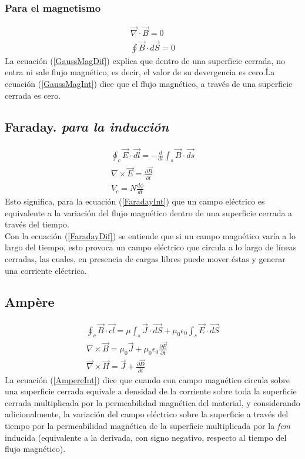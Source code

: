 \documentclass[12pt,spanish,lettersize,twocolumn]{article}
\begin{document}
\subsubsection{Para el magnetismo}
\begin{eqnarray}
\overrightarrow{\nabla}\cdot\overrightarrow{B} = 0\label{GaussMagDif}\\
\oint\overrightarrow{B}\cdot d\overrightarrow{S}=0\label{GaussMagInt}
\end{eqnarray}
La ecuaci\'on (\ref{GaussMagDif}) explica que dentro de una superficie cerrada, no entra ni sale flujo magn\'etico, es decir, el valor de su devergencia es cero.\'
La ecuaci\'on (\ref{GaussMagInt}) dice que el flujo magn\'etico, a trav\'es de una superficie cerrada es cero.

\subsection{Faraday. \emph{para la inducci\'on}}
\begin{eqnarray}
\oint_c \overrightarrow{E}\cdot \overrightarrow{dl} = -\frac{d}{dt}\int_s\overrightarrow{B}\cdot \overrightarrow{ds}\label{FaradayInt}\\
\nabla\times\overrightarrow{E}=\frac{\partial \overrightarrow{B}}{\partial t}\label{FaradayDif}\\
V_c=N\frac{d\phi}{dt}
\end{eqnarray}
Esto significa, para la ecuaci\'on (\ref{FaradayInt}) que un campo el\'ectrico es equivalente a la variaci\'on del flujo magn\'etico dentro de una superficie cerrada a trav\'es del tiempo.\\
Con la ecuaci\'on (\ref{FaradayDif}) se entiende que si un campo magn\'etico var\'ia a lo largo del tiempo, esto provoca un campo el\'ectrico que circula a lo largo de l\'ineas cerradas, las cuales, en presencia de cargas libres puede mover \'estas y generar una corriente el\'ectrica.

\subsection{Amp\`ere}
\begin{eqnarray}
\oint_c\overrightarrow{B}\cdot\overrightarrow{cl}=\mu\int_s\overrightarrow{J}\cdot\overrightarrow{dS}+\mu_0\epsilon_0\int_s\overrightarrow{E}\cdot\overrightarrow{dS}\label{AmpereInt}\\
\nabla\times\overrightarrow{B}=\mu_0\overrightarrow{J}+\mu_0\epsilon_0\frac{\partial\overrightarrow{E}}{\partial t}\\
\overrightarrow{\nabla}\times\overrightarrow{H}=\overrightarrow{J}+\frac{\partial\overrightarrow{D}}{\partial t}
\end{eqnarray}
La ecuaci\'on (\ref{AmpereInt}) dice que cuando cun campo magn\'etico circula sobre una superficie cerrada equivale a densidad de la corriente sobre toda la superficie cerrada multiplicada por la permeabilidad magn\'etica del material, y considerando adicionalmente, la variaci\'on del campo el\'ectrico sobre la superficie a trav\'es del tiempo por la permeabilidad magn\'etica de la superficie multiplicada por la \emph{fem} inducida (equivalente a la derivada, con signo negativo, respecto al tiempo del flujo magn\'etico).
\end{document}
